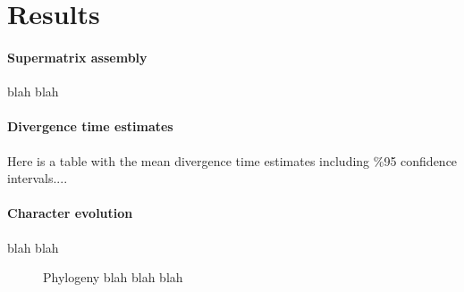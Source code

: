 \documentclass[review]{elsarticle}
\begin{document}

\section{Results}


\paragraph{Supermatrix assembly}
blah blah

\paragraph{Divergence time estimates}
Here is a table with the mean divergence time estimates including \%95 confidence intervals....

\paragraph{Character evolution}
blah blah

\begin{figure}[p]
    \vspace*{-2cm}
    \caption{Phylogeny blah blah blah}
    \label{posteriors}
\end{figure}
\end{document}
